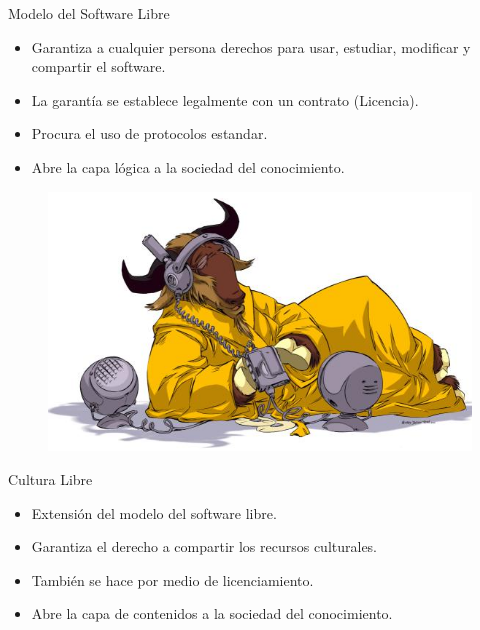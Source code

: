 \documentclass{beamer}
\begin{document}
\begin{frame}{Modelo del Software Libre}
  \begin{itemize}
  \item Garantiza a cualquier persona derechos para usar, estudiar, modificar y compartir el software.
  \item La garantía se establece legalmente con un contrato (Licencia).
  \item Procura el uso de protocolos estandar.
  \item Abre la capa lógica a la sociedad del conocimiento.
  \end{itemize}
  \begin{figure}
    \includegraphics{img/listen-eighth}
  \end{figure}
\end{frame}

\begin{frame}{Cultura Libre}
  \begin{itemize}
  \item Extensión del modelo del software libre.
  \item Garantiza el derecho a compartir los recursos culturales.
  \item También se hace por medio de licenciamiento.%
  \item Abre la capa de contenidos a la sociedad del conocimiento.
  \end{itemize}
\end{frame}


\end{document}

